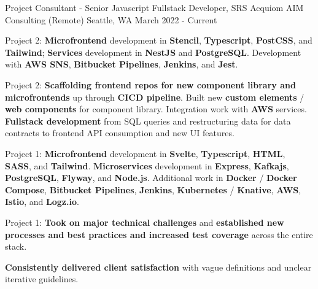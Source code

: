 \begin{cventries}
\cventry
{Project Consultant - Senior Javascript Fullstack Developer, SRS Acquiom} %
{AIM Consulting (Remote)} %
{Seattle, WA} %
{March 2022 - Current} %
{
\begin{cvitems}
\item {Project 2: \textbf{Microfrontend} development in \textbf{Stencil}, \textbf{Typescript}, \textbf{PostCSS}, and \textbf{Tailwind}; \textbf{Services} development in \textbf{NestJS} and \textbf{PostgreSQL}. Development with \textbf{AWS SNS}, \textbf{Bitbucket Pipelines}, \textbf{Jenkins}, and \textbf{Jest}.}
\item {Project 2: \textbf{Scaffolding frontend repos for new component library and microfrontends} up through \textbf{CICD pipeline}. Built new \textbf{custom elements} / \textbf{web components} for component library. Integration work with \textbf{AWS} services. \textbf{Fullstack development} from SQL queries and restructuring data for data contracts to frontend API consumption and new UI features. }
\item {Project 1: \textbf{Microfrontend} development in \textbf{Svelte}, \textbf{Typescript}, \textbf{HTML}, \textbf{SASS}, and \textbf{Tailwind}. \textbf{Microservices} development in \textbf{Express}, \textbf{Kafkajs}, \textbf{PostgreSQL}, \textbf{Flyway}, and \textbf{Node.js}. Additional work in \textbf{Docker} / \textbf{Docker Compose}, \textbf{Bitbucket Pipelines}, \textbf{Jenkins}, \textbf{Kubernetes} / \textbf{Knative}, \textbf{AWS}, \textbf{Istio}, and \textbf{Logz.io}.}
\item {Project 1: \textbf{Took on major technical challenges} and \textbf{established new processes and best practices and increased test coverage} across the entire stack.}
\item {\textbf{Consistently delivered client satisfaction} with vague definitions and unclear iterative guidelines.}
\end{cvitems}
}


\end{cventries}
